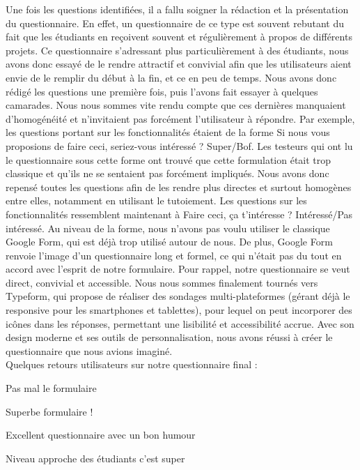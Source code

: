Une fois les questions identifiées, il a fallu soigner la rédaction et la présentation du questionnaire. En effet, un questionnaire de ce type est souvent rebutant du fait que les étudiants en reçoivent souvent et régulièrement à propos de différents projets. Ce questionnaire s'adressant plus particulièrement à des étudiants, nous avons donc essayé de le rendre attractif et convivial afin que les utilisateurs aient envie de le remplir du début à la fin, et ce en peu de temps.
Nous avons donc rédigé les questions une première fois, puis l'avons fait essayer à quelques camarades. Nous nous sommes vite rendu compte que ces dernières manquaient d'homogénéité et n'invitaient pas forcément l'utilisateur à répondre. Par exemple, les questions portant sur les fonctionnalités étaient de la forme \og{}Si nous vous proposions de faire ceci, seriez-vous intéressé ? Super/Bof\fg{}. Les testeurs qui ont lu le questionnaire sous cette forme ont trouvé que cette formulation était trop classique et qu'ils ne se sentaient pas forcément impliqués. Nous avons donc repensé toutes les questions afin de les rendre plus directes et surtout homogènes entre elles, notamment en utilisant le tutoiement. Les questions sur les fonctionnalités ressemblent maintenant à \og{}Faire ceci, ça t'intéresse ? Intéressé/Pas intéressé\fg{}. \newline
Au niveau de la forme, nous n'avons pas voulu utiliser le classique Google Form, qui est déjà trop utilisé autour de nous. De plus, Google Form renvoie l'image d’un questionnaire long et formel, ce qui n'était pas du tout en accord avec l'esprit de notre formulaire. Pour rappel, notre questionnaire se veut direct, convivial et accessible. Nous nous sommes finalement tournés vers Typeform, qui propose de réaliser des sondages multi-plateformes (gérant déjà le responsive pour les smartphones et tablettes), pour lequel on peut incorporer des icônes dans les réponses, permettant une lisibilité et accessibilité accrue. Avec son design moderne et ses outils de personnalisation, nous avons réussi à créer le questionnaire que nous avions imaginé. \\

Quelques retours utilisateurs sur notre questionnaire final :\\
\begin{description}
    \item \og{}Pas mal le formulaire\fg{}
    \item \og{}Superbe formulaire !\fg{}
    \item \og{}Excellent questionnaire avec un bon humour\fg{}
    \item \og{}Niveau approche des étudiants c’est super\fg{}
\end{description}

